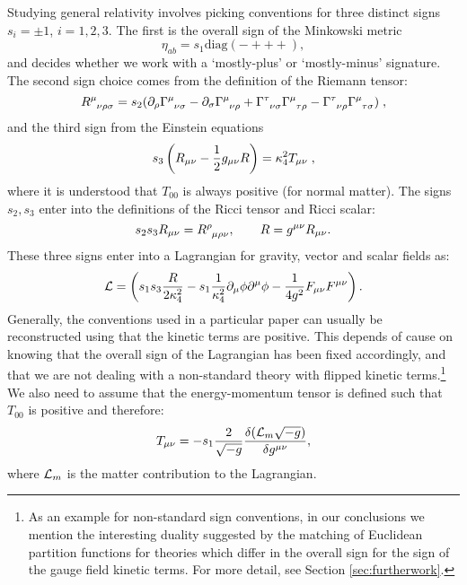 Studying general relativity involves picking conventions for three distinct signs $s_i=\pm 1$, $i=1,2,3$. The first is the overall sign of the Minkowski metric
\begin{equation*}
	\eta_{a b} = s_1 \text{diag}(-+++),
\end{equation*}
and decides whether we work with a `mostly-plus' or `mostly-minus' signature. The second sign choice comes from the definition of the Riemann tensor:
\begin{equation*}
	\tensor{R}{^\mu_{\nu \rho \sigma}} = s_2(\partial_\rho \tensor{\Gamma}{^\mu_{\nu \sigma}} - \partial_\sigma \tensor{\Gamma}{^\mu_{\nu \rho}} +  \tensor{\Gamma}{^\tau_{\nu \sigma}} \tensor{\Gamma}{^\mu_{\tau \rho}} -  \tensor{\Gamma}{^\tau_{\nu \rho}} \tensor{\Gamma}{^\mu_{\tau \sigma}} )\;,
\end{equation*} 
and the third sign from the Einstein equations
\begin{equation*}
	s_3 \left( R_{\mu \nu} - \frac{1}{2} g_{\mu \nu} R \right)=  \kappa_4^2 T_{\mu \nu}\;,
\end{equation*}
where it is understood that $T_{00}$ is always positive (for normal matter). The signs $s_2,s_3$ enter into the definitions of the Ricci tensor and Ricci scalar:
\begin{equation*}
	s_2 s_3 R_{\mu \nu} =  \tensor{R}{^\rho_{\mu \rho \nu}}, \qquad R = g^{\mu \nu} R_{\mu \nu}.
\end{equation*}
These three signs enter into a Lagrangian for gravity, vector and scalar fields as:
\begin{equation*}
	{\cal L} = \left(s_1 s_3 \frac{R}{2 \kappa_4^2} - s_1 \frac{1}{\kappa_4^2} \partial_\mu \phi \partial^\mu \phi  - \frac{1}{4 g^2} F_{\mu \nu} F^{\mu \nu} \right).
\end{equation*}
Generally, the conventions used in a particular paper can usually be reconstructed using that the kinetic terms are positive. This depends of cause on knowing that the overall sign of the Lagrangian has been fixed accordingly, and that we are not dealing with a non-standard theory with flipped kinetic terms.\footnote{As an example for non-standard sign conventions, in our conclusions we mention the interesting duality suggested by the matching of Euclidean partition functions for theories which differ in the overall sign for the sign of the gauge field kinetic terms. For more detail, see Section \ref{sec:furtherwork}.} We also need to assume that the energy-momentum tensor is defined such that $T_{00}$ is positive and therefore:
\begin{equation*}
	T_{\mu \nu} = -s_1 \frac{2}{\sqrt{-g}} \frac{ \delta(
	{\cal L}_m \sqrt{-g})}{\delta g^{\mu \nu}},
\end{equation*}
where ${\cal L}_m$ is the matter contribution to the Lagrangian. 

